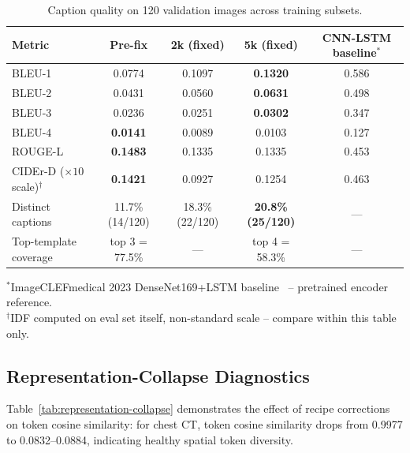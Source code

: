 \documentclass[conference]{IEEEtran}
\begin{document}
\begin{table}[t]
\centering
\caption{Caption quality on 120 validation images across training subsets.}
\label{tab:caption-quality}
\small
\renewcommand{\arraystretch}{1.10}
\begin{tabular}{@{}p{}cccc@{}}
\toprule
\textbf{Metric} & \textbf{Pre-fix} & \textbf{2k (fixed)} & \textbf{5k (fixed)} & \textbf{CNN-LSTM baseline$^\ast$} \\
\midrule
BLEU-1 & 0.0774 & 0.1097 & \textbf{0.1320} & 0.586 \\
BLEU-2 & 0.0431 & 0.0560 & \textbf{0.0631} & 0.498 \\
BLEU-3 & 0.0236 & 0.0251 & \textbf{0.0302} & 0.347 \\
BLEU-4 & \textbf{0.0141} & 0.0089 & 0.0103 & 0.127 \\
ROUGE-L & \textbf{0.1483} & 0.1335 & 0.1335 & 0.453 \\
CIDEr-D ($\times 10$ scale)$^\dagger$ & \textbf{0.1421} & 0.0927 & 0.1254 & 0.463 \\
Distinct captions & 11.7\% (14/120) & 18.3\% (22/120) & \textbf{20.8\% (25/120)} & --- \\
Top-template coverage & top 3 = 77.5\% & --- & top 4 = 58.3\% & --- \\
\bottomrule
\end{tabular}

\vspace{2pt}
\begin{minipage}{0.96\textwidth}
\footnotesize
$^\ast$ImageCLEFmedical 2023 DenseNet169+LSTM baseline~\cite{ruckert2023imageclef} -- pretrained encoder reference.\\
$^\dagger$IDF computed on eval set itself, non-standard scale -- compare within this table only.
\end{minipage}
\end{table}

\subsection{Representation-Collapse Diagnostics}
\label{sec:results-collapse}
Table~\ref{tab:representation-collapse} demonstrates the effect of recipe corrections on token cosine similarity: for chest CT, token cosine similarity drops from 0.9977 to 0.0832--0.0884, indicating healthy spatial token diversity.
\end{document}
